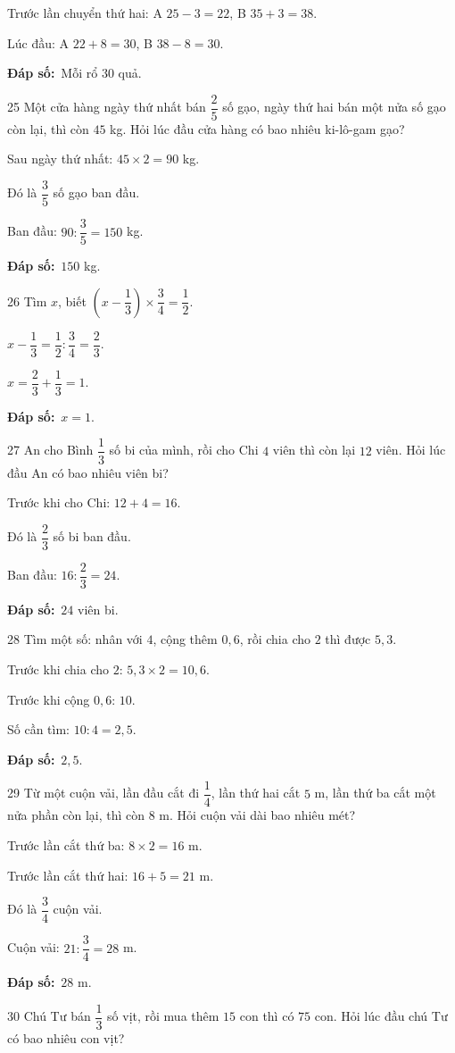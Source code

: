 \documentclass[11pt]{article}
\newif\ifsol \solfalse
\providecommand{\AnsWord}{Đáp số}
\newcommand{\dapso}[1]{\par\textbf{\AnsWord:}\ #1}
\newcommand{\probsol}[1]{%
  \begin{lrbox}{\solmeasure}\begin{minipage}{\dimexpr\linewidth-24pt\relax}#1\end{minipage}\end{lrbox}%
  \ifsol
    \begin{solbox}#1\end{solbox}%
  \else
    \setlength{\solht}{\dimexpr\ht\solmeasure+\dp\solmeasure+0.85cm\relax}%
    \ifdim\solht<1.35cm\setlength{\solht}{1.35cm}\fi
    \begin{tcolorbox}[colback=white,colframe=Line,boxrule=0.8pt,arc=5pt,
      left=8pt,right=8pt,top=4pt,bottom=4pt,height=\solht]{\footnotesize\color{Slate}\itshape\WorkWord}\end{tcolorbox}%
  \fi}
\newcommand{\gap}{\vspace{0.3cm}}
\def\WorkWord{Bài làm:}
\def\AnsWord{Đáp số}
\begin{document}
\probsol{
Trước lần chuyển thứ hai: A $25-3=22$, B $35+3=38$.\par Lúc đầu: A $22+8=30$, B $38-8=30$.
\dapso{Mỗi rổ $30$ quả.}}
\gap
\begin{probbox}{25}{\relax}
Một cửa hàng ngày thứ nhất bán $\dfrac25$ số gạo, ngày thứ hai bán một nửa số gạo còn lại, thì còn $45$ kg. Hỏi lúc đầu cửa hàng có bao nhiêu ki-lô-gam gạo?
\end{probbox}
\probsol{
Sau ngày thứ nhất: $45\times2=90$ kg.\par Đó là $\dfrac35$ số gạo ban đầu.\par Ban đầu: $90:\dfrac35=150$ kg.
\dapso{$150$ kg.}}
\gap
\begin{probbox}{26}{\relax}
Tìm $x$, biết $\left(x-\dfrac13\right)\times\dfrac34=\dfrac12$.
\end{probbox}
\probsol{
$x-\dfrac13=\dfrac12:\dfrac34=\dfrac23$.\par $x=\dfrac23+\dfrac13=1$.
\dapso{$x=1$.}}
\gap
\begin{probbox}{27}{\relax}
An cho Bình $\dfrac13$ số bi của mình, rồi cho Chi $4$ viên thì còn lại $12$ viên. Hỏi lúc đầu An có bao nhiêu viên bi?
\end{probbox}
\probsol{
Trước khi cho Chi: $12+4=16$.\par Đó là $\dfrac23$ số bi ban đầu.\par Ban đầu: $16:\dfrac23=24$.
\dapso{$24$ viên bi.}}
\gap
\begin{probbox}{28}{\relax}
Tìm một số: nhân với $4$, cộng thêm $0{,}6$, rồi chia cho $2$ thì được $5{,}3$.
\end{probbox}
\probsol{
Trước khi chia cho $2$: $5{,}3\times2=10{,}6$.\par Trước khi cộng $0{,}6$: $10$.\par Số cần tìm: $10:4=2{,}5$.
\dapso{$2{,}5$.}}
\gap
\begin{probbox}{29}{\relax}
Từ một cuộn vải, lần đầu cắt đi $\dfrac14$, lần thứ hai cắt $5$ m, lần thứ ba cắt một nửa phần còn lại, thì còn $8$ m. Hỏi cuộn vải dài bao nhiêu mét?
\end{probbox}
\probsol{
Trước lần cắt thứ ba: $8\times2=16$ m.\par Trước lần cắt thứ hai: $16+5=21$ m.\par Đó là $\dfrac34$ cuộn vải.\par Cuộn vải: $21:\dfrac34=28$ m.
\dapso{$28$ m.}}
\gap
\begin{probbox}{30}{\relax}
Chú Tư bán $\dfrac13$ số vịt, rồi mua thêm $15$ con thì có $75$ con. Hỏi lúc đầu chú Tư có bao nhiêu con vịt?
\end{probbox}
\end{document}
